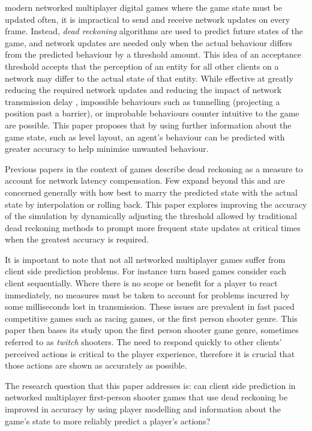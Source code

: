 \documentclass[journal]{IEEEtran}
\begin{document}
 modern networked multiplayer digital games where the game state must be updated often, it is impractical to send and receive network updates on every frame. Instead, \textit{dead reckoning} algorithms are used to predict future states of the game, and network updates are needed only when the actual behaviour differs from the predicted behaviour by a threshold amount. This idea of an acceptance threshold accepts that the perception of an entity for all other clients on a network may differ to the actual state of that entity. While effective at greatly reducing the required network updates and reducing the impact of network transmission delay \cite{pantel2002suitability}, impossible behaviours such as tunnelling (projecting a position past a barrier), or improbable behaviours counter intuitive to the game are possible. This paper proposes that by using further information about the game state, such as level layout, an agent's behaviour can be predicted with greater accuracy to help minimise unwanted behaviour.

Previous papers in the context of games describe dead reckoning as a measure to account for network latency compensation. Few expand beyond this and are concerned generally with how best to marry the predicted state with the actual state by interpolation or rolling back. This paper explores improving the accuracy of the simulation by dynamically adjusting the threshold allowed by traditional dead reckoning methods to prompt more frequent state updates at critical times when the greatest accuracy is required.

It is important to note that not all networked multiplayer games suffer from client side prediction problems. For instance turn based games consider each client sequentially. Where there is no scope or benefit for a player to react immediately, no measures must be taken to account for problems incurred by some milliseconds lost in transmission. These issues are prevalent in fast paced competitive games such as racing games, or the first person shooter genre. This paper then bases its study upon the first person shooter game genre, sometimes referred to as \textit{twitch} shooters. The need to respond quickly to other clients' perceived actions is critical to the player experience, therefore it is crucial that those actions are shown as accurately as possible.

The research question that this paper addresses is: can client side prediction in networked multiplayer first-person shooter games that use dead reckoning be improved in accuracy by using player modelling and information about the game's state to more reliably predict a player's actions?
\end{document}
